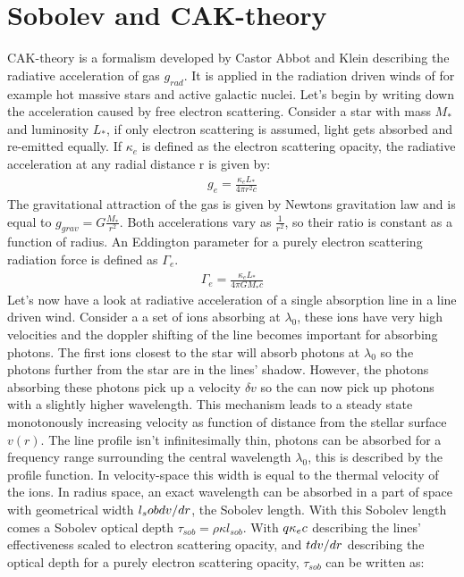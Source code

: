 \section{Sobolev and CAK-theory}
CAK-theory is a formalism developed by Castor Abbot and Klein \cite{CAK} describing the radiative acceleration of gas $g_{rad}$. It is applied in the radiation driven winds of for example hot massive stars  and active galactic nuclei. Let's begin by writing down the acceleration caused by free electron scattering. Consider a star with mass $M_*$ and luminosity $L_*$, if only electron scattering is assumed, light gets absorbed and re-emitted equally. If $\kappa_e$ is defined as the electron scattering opacity, the radiative acceleration at any radial distance r is given by:
\begin{align}
g_e = \frac{\kappa_e L_*}{4 \pi r^2 c}
\end{align}
The gravitational attraction of the gas is given by Newtons gravitation law and is equal to $g_{grav} = G\frac{M_*}{r^2}$. Both accelerations vary as $\frac{1}{r^2}$, so their ratio is constant as a function of radius. An Eddington parameter for a purely electron scattering radiation force is defined as $\Gamma_e$.
\begin{align}
\Gamma_e = \frac{\kappa_e L_*}{4 \pi G M_* c}
\end{align}
Let's now have a look at radiative acceleration of a single absorption line in a line driven wind. Consider a a set of ions absorbing at $\lambda_0$, these ions have very high velocities and the doppler shifting of the line becomes important for absorbing photons. The first ions closest to the star will absorb photons at $\lambda_0$ so the photons further from the star are in the lines' shadow. However, the photons absorbing these photons pick up a velocity $\delta v$ so the can now pick up photons with a slightly higher wavelength. This mechanism leads to a steady state monotonously increasing velocity as function of distance from the stellar surface $v(r)$. The line profile isn't infinitesimally thin, photons can be absorbed for a frequency range surrounding the central wavelength $\lambda_0$, this is described by the profile function. In velocity-space this width is equal to the thermal velocity of the ions. In radius space, an exact wavelength can be absorbed in a part of space with geometrical width $l_sob \def \frac{v_{th}}{dv/dr}$, the Sobolev length. With this Sobolev length comes a Sobolev optical depth $\tau_{sob} = \rho \kappa l_{sob}$. With $q \def \frac{\kappa v_{th}}{\kappa_e c}$ describing the lines' effectiveness scaled to electron scattering opacity, and $t \def  \frac{\rho \kappa_e c}{dv/dr}$ describing the optical depth for a purely electron scattering opacity, $\tau_{sob}$ can be written as:

